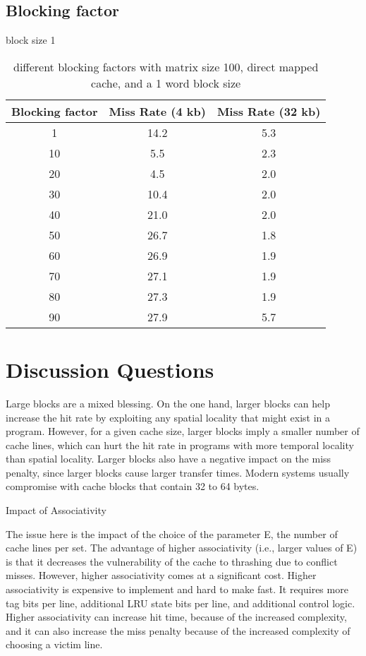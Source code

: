 \documentclass[letterpaper, 12pt, oneside]{memoir}
\begin{document}
\subsection{Blocking factor}
block size 1

\begin{table}[H]
\centering
\begin{tabular}{c|c|c}
    Blocking factor & Miss Rate (4 kb) & Miss Rate (32 kb) \\ \hline
    1   & 14.2  & 5.3 \\
    10  & 5.5   & 2.3 \\
    20  & 4.5   & 2.0 \\
    30  & 10.4  & 2.0 \\
    40  & 21.0  & 2.0 \\
    50  & 26.7  & 1.8 \\
    60  & 26.9  & 1.9 \\
    70  & 27.1  & 1.9 \\
    80  & 27.3  & 1.9 \\
    90  & 27.9  & 5.7 \\
\end{tabular}
\caption{different blocking factors with matrix size 100, direct mapped cache, and a 1 word block size}
\end{table}

\section{Discussion Questions}

Large blocks are a mixed blessing. On the one hand, larger blocks can help
increase the hit rate by exploiting any spatial locality that might exist in a program.
However, for a given cache size, larger blocks imply a smaller number of cache
lines, which can hurt the hit rate in programs with more temporal locality than
spatial locality. Larger blocks also have a negative impact on the miss penalty, since
larger blocks cause larger transfer times. Modern systems usually compromise
with cache blocks that contain 32 to 64 bytes.

Impact of Associativity

The issue here is the impact of the choice of the parameter E, the number of
cache lines per set. The advantage of higher associativity (i.e., larger values of E)
is that it decreases the vulnerability of the cache to thrashing due to conflict misses.
However, higher associativity comes at a significant cost. Higher associativity is
expensive to implement and hard to make fast. It requires more tag bits per
line, additional LRU state bits per line, and additional control logic. Higher
associativity can increase hit time, because of the increased complexity, and it can
also increase the miss penalty because of the increased complexity of choosing a
victim line.
\end{document}
